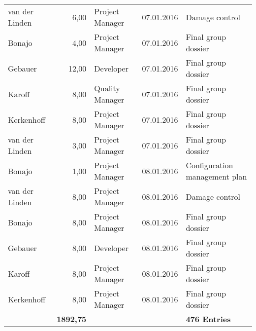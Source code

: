 \begin{longtable}{ l r p{2cm} c p{4cm} }
		van der Linden          & 6,00           & Project Manager & 07.01.2016    & Damage control                                                                  \\
		Bonajo                  & 4,00           & Project Manager & 07.01.2016    & Final group dossier                                                             \\
		Gebauer                 & 12,00          & Developer       & 07.01.2016    & Final group dossier                                                             \\
		Karoff                  & 8,00           & Quality Manager & 07.01.2016    & Final group dossier                                                             \\
		Kerkenhoff              & 8,00           & Project Manager & 07.01.2016    & Final group dossier                                                             \\
		van der Linden          & 3,00           & Project Manager & 07.01.2016    & Final group dossier                                                             \\
		Bonajo                  & 1,00           & Project Manager & 08.01.2016    & Configuration management plan                                                   \\
		van der Linden          & 8,00           & Project Manager & 08.01.2016    & Damage control                                                                  \\
		Bonajo                  & 8,00           & Project Manager & 08.01.2016    & Final group dossier                                                             \\
		Gebauer                 & 8,00           & Developer       & 08.01.2016    & Final group dossier                                                             \\
		Karoff                  & 8,00           & Project Manager & 08.01.2016    & Final group dossier                                                             \\
		Kerkenhoff              & 8,00           & Project Manager & 08.01.2016    & Final group dossier                                                             \\
		                        & \textbf{1892,75}        &                 &               & \textbf{476 Entries}                                                                    
	\end{longtable}
